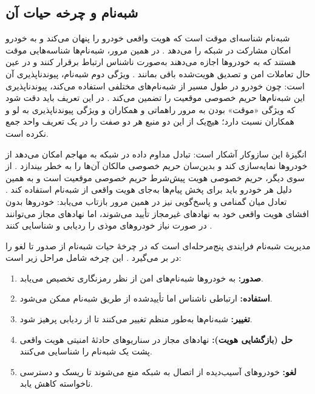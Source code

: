 \documentclass[12pt,a4paper]{article}
\begin{document}
\subsection{شبه‌نام و چرخه حیات آن}

شبه‌نام شناسه‌ای موقت است که هویت واقعی خودرو را پنهان می‌کند و به خودرو امکان مشارکت در شبکه را می‌دهد \cite{rahmawatiagustinaSystematicLiteratureReview2025}. در همین مرور، شبه‌نام‌ها شناسه‌هایی موقت هستند که به خودرو‌ها اجازه می‌دهند به‌صورت ناشناس ارتباط برقرار کنند و در عین حال تعاملات امن و تصدیق هویت‌شده باقی بمانند \cite{rahmawatiagustinaSystematicLiteratureReview2025}. ویژگی دوم شبه‌نام، پیوندناپذیری آن است: چون خودرو در طول مسیر از شبه‌نام‌های مختلفی استفاده می‌کند، پیوندناپذیری این شبه‌نام‌ها حریم خصوصی موقعیت را تضمین می‌کند \cite{luPseudonymChangingSocial2012}. در این تعریف باید دقت شود که ویژگی «موقت» بودن به مرور راهماتی و همکاران و ویژگی پیوندناپذیری به لو و همکاران نسبت دارد؛ هیچ‌یک از این دو منبع هر دو صفت را در یک تعریف واحد جمع نکرده است.

انگیزهٔ این سازوکار آشکار است: تبادل مداوم داده در شبکه به مهاجم امکان می‌دهد از خودرو‌ها نمایه‌سازی کند و بدین‌سان حریم خصوصی مالکان آن‌ها را به خطر بیندازد \cite{rahmawatiagustinaSystematicLiteratureReview2025}. از سوی دیگر، حریم خصوصی هویت پیش‌شرط حریم خصوصی موقعیت است و به همین دلیل هر خودرو باید برای پخش پیام‌ها به‌جای هویت واقعی از شبه‌نام استفاده کند \cite{luPseudonymChangingSocial2012}. تعادل میان گمنامی و پاسخ‌گویی نیز در همین مرور بازتاب می‌یابد: خودرو‌ها بدون افشای هویت واقعی خود به نهاد‌های غیرمجاز تأیید می‌شوند، اما نهاد‌های مجاز می‌توانند در صورت نیاز خودرو‌های موذی را ردیابی و شناسایی کنند \cite{rahmawatiagustinaSystematicLiteratureReview2025}.

مدیریت شبه‌نام فرایندی پنج‌مرحله‌ای است که در چرخهٔ حیات شبه‌نام از صدور تا لغو را در بر می‌گیرد \cite{rahmawatiagustinaSystematicLiteratureReview2025}. این چرخه شامل مراحل زیر است:

\begin{enumerate}
  \item \textbf{صدور:} به خودرو‌ها شبه‌نام‌های امن از نظر رمزنگاری تخصیص می‌یابد.
  \item \textbf{استفاده:} ارتباطی ناشناس اما تأییدشده از طریق شبه‌نام ممکن می‌شود.
  \item \textbf{تغییر:} شبه‌نام‌ها به‌طور منظم تغییر می‌کنند تا از ردیابی پرهیز شود.
  \item \textbf{حل (بازگشایی هویت):} نهاد‌های مجاز در سناریو‌های حادثهٔ امنیتی هویت واقعی پشت یک شبه‌نام را شناسایی می‌کنند.
  \item \textbf{لغو:} خودرو‌های آسیب‌دیده از اتصال به شبکه منع می‌شوند تا ریسک و دسترسی ناخواسته کاهش یابد.
\end{enumerate}
\end{document}
